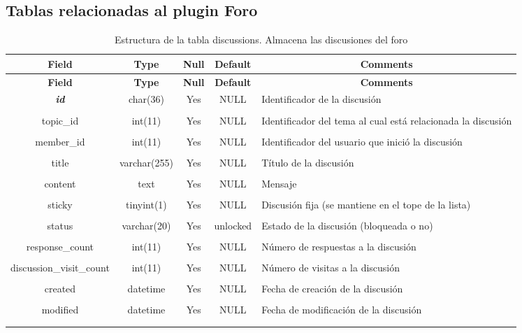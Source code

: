 \subsection{Tablas relacionadas al plugin Foro}
%
%
%
\begin{longtable}{c c c c l}
	\multicolumn{1}{c}{\textbf{Field}} &
	\multicolumn{1}{c}{\textbf{Type}} &
	\multicolumn{1}{c}{\textbf{Null}} &
	\multicolumn{1}{c}{\textbf{Default}} &
	\multicolumn{1}{c}{\textbf{Comments}} \\ \hline \hline
\endfirsthead
	\multicolumn{1}{c}{\textbf{Field}} &
	\multicolumn{1}{c}{\textbf{Type}} &
	\multicolumn{1}{c}{\textbf{Null}} &
	\multicolumn{1}{c}{\textbf{Default}} &
	\multicolumn{1}{c}{\textbf{Comments}} \\ \hline \hline
\endhead \endfoot
	\textbf{\textit{id}} & char(36) & Yes & NULL & \parbox[t]{0.35\textwidth}{Identificador de la discusión} \\ \\ \hline
	topic\_id & int(11) & Yes & NULL & \parbox[t]{0.35\textwidth}{Identificador del tema al cual está relacionada la discusión} \\ \\  \hline
	member\_id & int(11) & Yes & NULL & \parbox[t]{0.35\textwidth}{Identificador del usuario que inició la discusión} \\ \\  \hline
	title & varchar(255) & Yes & NULL & \parbox[t]{0.35\textwidth}{Título de la discusión} \\ \\  \hline
	content & text & Yes & NULL & \parbox[t]{0.35\textwidth}{Mensaje} \\ \\  \hline
	sticky & tinyint(1) & Yes & NULL & \parbox[t]{0.35\textwidth}{Discusión fija (se mantiene en el tope de la lista)} \\ \\  \hline
	status & varchar(20) & Yes & unlocked & \parbox[t]{0.35\textwidth}{Estado de la discusión (bloqueada o no)} \\ \\  \hline
	response\_count & int(11) & Yes & NULL & \parbox[t]{0.35\textwidth}{Número de respuestas a la discusión} \\ \\  \hline
	discussion\_visit\_count & int(11) & Yes & NULL & \parbox[t]{0.35\textwidth}{Número de visitas a la discusión} \\ \\  \hline
	created & datetime & Yes & NULL & \parbox[t]{0.35\textwidth}{Fecha de creación de la discusión} \\ \\  \hline
	modified & datetime & Yes & NULL & \parbox[t]{0.35\textwidth}{Fecha de modificación de la discusión} \\ \\ 
\caption[Estructura de la tabla discussions]{Estructura de la tabla discussions. Almacena las discusiones del foro} \label{tab:forum_discussions-structure} \\
\end{longtable}

